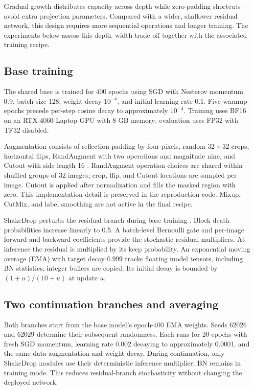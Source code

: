 \documentclass[letterpaper]{article}
\begin{document}
Gradual growth distributes capacity across depth while zero-padding shortcuts avoid extra projection parameters. Compared with a wider, shallower residual network, this design requires more sequential operations and longer training. The experiments below assess this depth--width trade-off together with the associated training recipe.

\subsection{Base training}
The shared base is trained for 400 epochs using SGD with Nesterov momentum 0.9, batch size 128, weight decay $10^{-4}$, and initial learning rate 0.1. Five warmup epochs precede per-step cosine decay to approximately $10^{-4}$. Training uses BF16 on an RTX 4060 Laptop GPU with 8 GB memory; evaluation uses FP32 with TF32 disabled.

Augmentation consists of reflection-padding by four pixels, random $32\times32$ crops, horizontal flips, RandAugment with two operations and magnitude nine, and Cutout with side length 16 \citep{cubuk2020randaugment,devries2017cutout}. RandAugment operation choices are shared within shuffled groups of 32 images; crop, flip, and Cutout locations are sampled per image. Cutout is applied after normalization and fills the masked region with zero. This implementation detail is preserved in the reproduction code. Mixup, CutMix, and label smoothing are not active in the final recipe.

ShakeDrop perturbs the residual branch during base training \citep{yamada2019shake}. Block death probabilities increase linearly to 0.5. A batch-level Bernoulli gate and per-image forward and backward coefficients provide the stochastic residual multipliers. At inference the residual is multiplied by its keep probability. An exponential moving average (EMA) with target decay 0.999 tracks floating model tensors, including BN statistics; integer buffers are copied. Its initial decay is bounded by $(1+u)/(10+u)$ at update $u$.

\subsection{Two continuation branches and averaging}
Both branches start from the base model's epoch-400 EMA weights. Seeds 62026 and 62029 determine their subsequent randomness. Each runs for 20 epochs with fresh SGD momentum, learning rate 0.002 decaying to approximately 0.0001, and the same data augmentation and weight decay. During continuation, only ShakeDrop modules use their deterministic inference multiplier; BN remains in training mode. This reduces residual-branch stochasticity without changing the deployed network.
\end{document}
